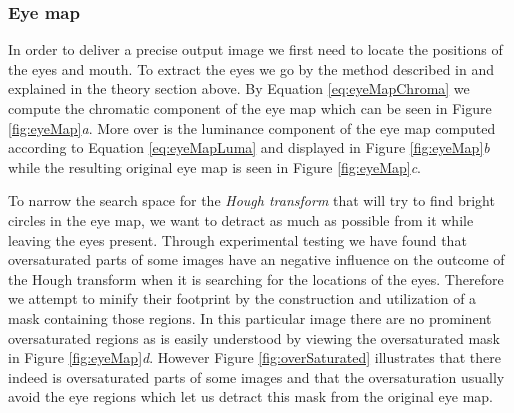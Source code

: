 \subsubsection{Eye map}

In order to deliver a precise output image we first need to locate the positions of the eyes and mouth. To extract the eyes we go by the method described in \cite{fdInColorImages} and explained in the theory section above. By Equation \ref{eq:eyeMapChroma} we compute the chromatic component of the eye map which can be seen in Figure \ref{fig:eyeMap}\textit{a}. More over is the luminance component of the eye map computed according to Equation \ref{eq:eyeMapLuma} and displayed in Figure \ref{fig:eyeMap}\textit{b} while the resulting original eye map is seen in Figure \ref{fig:eyeMap}\textit{c}.



To narrow the search space for the \textit{Hough transform} that will try to find bright circles in the eye map, we want to detract as much as possible from it while leaving the eyes present. Through experimental testing we have found that oversaturated parts of some images have an negative influence on the outcome of the Hough transform when it is searching for the locations of the eyes. Therefore we attempt to minify their footprint by the construction and utilization of a mask containing those regions. In this particular image there are no prominent oversaturated regions as is easily understood by viewing the oversaturated mask in Figure \ref{fig:eyeMap}\textit{d}. However Figure \ref{fig:overSaturated} illustrates that there indeed is oversaturated parts of some images and that the oversaturation usually avoid the eye regions which let us detract this mask from the original eye map. 


